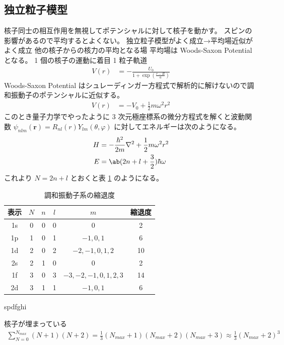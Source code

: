 \documentclass[uplatex,dvipdfmx,a4paper,11pt]{jlreq}
\newcommand{\rr}{\bm{r}}
\numberwithin{equation}{section}
\theoremstyle{definition}
\begin{document}
\subsection{独立粒子模型}
核子同士の相互作用を無視してポテンシャルに対して核子を動かす。
スピンの影響があるので平均するとよくない。
独立粒子模型がよく成立→平均場近似がよく成立
他の核子からの核力の平均となる場 平均場は Woods-Saxon Potential となる。
1 個の核子の運動に着目 1 粒子軌道
\begin{align}
  V(r) & = -\frac{U_0}{1 + \exp(\frac{r - R}{a})}
\end{align}
Woods-Saxon Potential はシュレーディンガー方程式で解析的に解けないので調和振動子のポテンシャルに近似する。
\begin{align}
  V(r) & = -V_0 + \frac{1}{2}m\omega^2r^2
\end{align}
このとき量子力学でやったように 3 次元極座標系の微分方程式を解くと波動関数 $\psi_{nlm}(\rr) = R_{nl}(r)Y_{lm}(\theta, \varphi)$ に対してエネルギーは次のようになる。
\begin{align}
  H & = -\frac{\hbar^2}{2m}\nabla^2 + \frac{1}{2}m\omega^2r^2 \\
  E & = \ab(2n + l + \frac{3}{2})\hbar\omega
\end{align}
これより $N = 2n + l$ とおくと表 \ref{table:oscillator} のようになる。
\begin{table}[hbtp]
  \centering
  \begin{tabular}{|c|c|c|c|c|c|}
    \hline
    表示 & $N$ & $n$ & $l$ & $m$                & 縮退度 \\
    \hline \hline
    1s & 0   & 0   & 0   & 0                  & 2   \\
    1p & 1   & 0   & 1   & $-1,0,1$           & 6   \\
    1d & 2   & 0   & 2   & $-2,-1,0,1,2$      & 10  \\
    2s & 2   & 1   & 0   & 0                  & 2   \\
    1f & 3   & 0   & 3   & $-3,-2,-1,0,1,2,3$ & 14  \\
    2d & 3   & 1   & 1   & $-1,0,1$           & 6   \\
    \hline
  \end{tabular}
  \caption{調和振動子系の縮退度}
  \label{table:oscillator}
\end{table}
spdfghi

核子が埋まっている
\begin{align}
  \sum_{N = 0}^{N_{max}}(N + 1)(N + 2) = \frac{1}{3}(N_{max} + 1)(N_{max} + 2)(N_{max} + 3) \approx \frac{1}{3}(N_{max} + 2)^3
\end{align}
\end{document}
